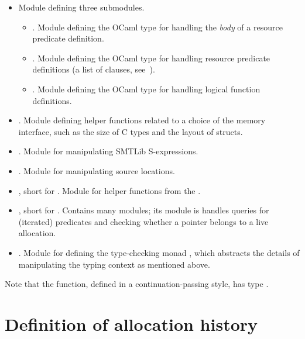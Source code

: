 \begin{itemize}
        allocation token used in the resource context.
    \item {} Module defining three submodules.
        \begin{itemize}
            \item {}. Module defining the OCaml type for
                handling the \emph{body} of a resource predicate definition.
            \item {}. Module defining the OCaml type for
                handling resource predicate definitions (a list of clauses,
                see~).
            \item {}. Module defining the OCaml type for
                handling logical  function definitions.
        \end{itemize}
    \item {}. Module defining helper functions related
        to a choice of the  memory interface, such as the size
        of C types and the layout of structs.
    \item {}. Module for manipulating SMTLib S-expressions.
    \item {}. Module for manipulating source locations.
    \item {}, short for . Module
        for helper functions from the .
    \item {}, short for . Contains
        many modules; its  module is handles queries for
        (iterated) predicates and checking whether a pointer belongs to a live
        allocation.
    \item {}. Module for defining the type-checking monad
        , which abstracts the details of manipulating the
        typing context as mentioned above.
\end{itemize}

Note that the  function, defined in a
continuation-passing style, has type .

\section{Definition of allocation history}

